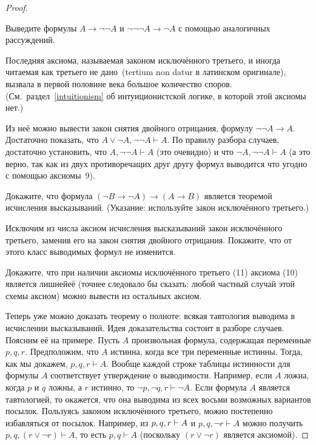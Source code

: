 \begin{proof}
\begin{problem}
Выведите формулы $A\to\lnot\lnot A$ и $\lnot\lnot\lnot A\to\lnot
A$ с помощью аналогичных рассуждений.
\end{problem}

Последняя аксиома, называемая  законом исключённого
третьего,%
%
и иногда читаемая как  третьего не дано\
(tertium
non datur в латинском оригинале), вызвала в первой
половине века большое количество споров.
(См.~раздел~\ref{intuitionism} об интуиционистской логике,%
в которой этой аксиомы нет.)

Из неё можно вывести закон  снятия двойного отрицания,%
формулу $\lnot\lnot A\to A$. Достаточно
показать, что $A\lor \lnot A, \lnot\lnot A \vdash A$. По правилу
разбора случаев, достаточно установить, что $A, \lnot\lnot A
\vdash A$ (это очевидно) и что $\lnot A, \lnot\lnot A \vdash
A$ (а это верно, так как из двух противоречащих друг другу
формул выводится что угодно с помощью аксиомы~9).

\begin{problem}
Докажите, что формула $(\lnot B\to\lnot A)\to(A\to B)$ является
теоремой исчисления высказываний. (Указание: используйте закон
исключённого третьего.)
\end{problem}

\begin{problem}
Исключим из числа аксиом исчисления высказываний закон
исключённого третьего, заменив его на закон снятия двойного
отрицания. Покажите, что от этого класс выводимых формул не
изменится.
\end{problem}

\begin{problem}
Докажите, что при наличии аксиомы исключённого третьего (11)
аксиома (10) является лишней\т её (точнее следовало бы сказать:
любой частный случай этой схемы аксиом) можно вывести из
остальных аксиом.
\end{problem}

Теперь уже можно доказать теорему о полноте: всякая тавтология
выводима в исчислении высказываний. Идея доказательства состоит
в разборе случаев. Поясним её на примере. Пусть $A$\т
произвольная формула, содержащая переменные $p,q,r$.
Предположим, что $A$ истинна, когда все три переменные истинны.
Тогда, как мы докажем,
        $
   p,q,r \vdash A.
        $
Вообще каждой строке таблицы истинности для формулы $A$
соответствует утверждение о выводимости. Например, если $A$
ложна, когда $p$ и $q$ ложны, а $r$ истинно, то
        $
\lnot p, \lnot q, r \vdash \lnot A.
        $
Если формула $A$ является тавтологией, то окажется, что она
выводима из всех восьми возможных вариантов посылок. Пользуясь
законом исключённого третьего, можно постепенно избавляться от
посылок. Например, из $p,q,r\hm\vdash A$ и $p,q,\lnot r\vdash A$
можно получить $p,q,(r\lor\lnot r)\vdash A$, то есть $p,q\vdash
A$ (поскольку $(r\lor\lnot r)$ является аксиомой).


\end{proof}
